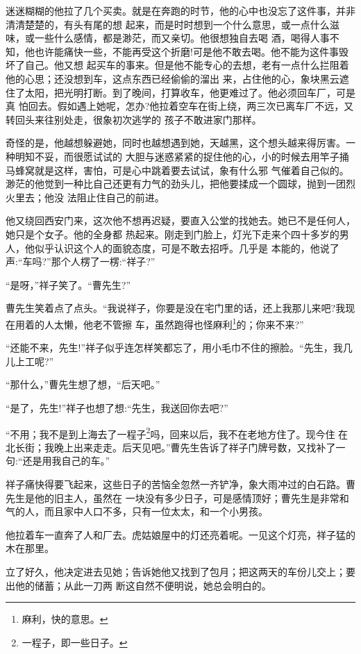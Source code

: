 \documentclass[11pt,a4paper,onecolumn]{article}
\begin{document}
迷迷糊糊的他拉了几个买卖。就是在奔跑的时节，他的心中也没忘了这件事，并非清清楚楚的，有头有尾的想
起来，而是时时想到一个什么意思，或一点什么滋味，或一些什么感情，都是渺茫，而又亲切。他很想独自去喝
酒，喝得人事不知，他也许能痛快一些，不能再受这个折磨!可是他不敢去喝。他不能为这件事毁坏了自己。他又想
起买车的事来。但是他不能专心的去想，老有一点什么拦阻着他的心思；还没想到车，这点东西已经偷偷的溜出
来，占住他的心，象块黑云遮住了太阳，把光明打断。到了晚间，打算收车，他更难过了。他必须回车厂，可是真
怕回去。假如遇上她呢，怎办?他拉着空车在街上绕，两三次已离车厂不远，又转回头来往别处走，很象初次逃学的
孩子不敢进家门那样。

奇怪的是，他越想躲避她，同时也越想遇到她，天越黑，这个想头越来得厉害。一种明知不妥，而很愿试试的
大胆与迷惑紧紧的捉住他的心，小的时候去用竿子捅马蜂窝就是这样，害怕，可是心中跳着要去试试，象有什么邪
气催着自己似的。渺茫的他觉到一种比自己还更有力气的劲头儿，把他要揉成一个圆球，抛到一团烈火里去；他没
法阻止住自己的前进。

他又绕回西安门来，这次他不想再迟疑，要直入公堂的找她去。她已不是任何人，她只是个女子。他的全身都
热起来。刚走到门脸上，灯光下走来个四十多岁的男人，他似乎认识这个人的面貌态度，可是不敢去招呼。几乎是
本能的，他说了声:``车吗?''那个人楞了一楞:``祥子?''

``是呀，''祥子笑了。``曹先生?''

曹先生笑着点了点头。``我说祥子，你要是没在宅门里的话，还上我那儿来吧?我现在用着的人太懒，他老不管擦
车，虽然跑得也怪麻利\footnote{麻利，快的意思。}的；你来不来?''

``还能不来，先生!''祥子似乎连怎样笑都忘了，用小毛巾不住的擦脸。``先生，我几儿上工呢?''

``那什么，''曹先生想了想，``后天吧。''

``是了，先生!''祥子也想了想:``先生，我送回你去吧?''

``不用；我不是到上海去了一程子\footnote{一程子，即一些日子。}吗，回来以后，我不在老地方住了。现今住
在北长街；我晚上出来走走。后天见吧。''曹先生告诉了祥子门牌号数，又找补了一句:``还是用我自己的车。''

祥子痛快得要飞起来，这些日子的苦恼全忽然一齐铲净，象大雨冲过的白石路。曹先生是他的旧主人，虽然在
一块没有多少日子，可是感情顶好；曹先生是非常和气的人，而且家中人口不多，只有一位太太，和一个小男孩。

他拉着车一直奔了人和厂去。虎姑娘屋中的灯还亮着呢。一见这个灯亮，祥子猛的木在那里。

立了好久，他决定进去见她；告诉她他又找到了包月；把这两天的车份儿交上；要出他的储蓄；从此一刀两
断\myrule 这自然不便明说，她总会明白的。
\end{document}
